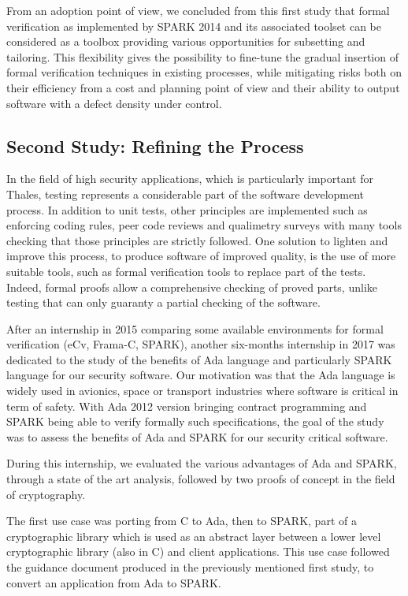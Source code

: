 \documentclass{llncs}
\begin{document}
From an adoption point of view, we concluded from this first study that formal
verification as implemented by SPARK 2014 and its associated toolset can be
considered as a toolbox providing various opportunities for subsetting and
tailoring. This flexibility gives the possibility to fine-tune the gradual
insertion of formal verification techniques in existing processes, while
mitigating risks both on their efficiency from a cost and planning point of
view and their ability to output software with a defect density under control.

\subsection{Second Study: Refining the Process}

In the field of high security applications, which is particularly important for
Thales, testing represents a considerable part of the software development
process. In addition to unit tests, other principles are implemented such as
enforcing coding rules, peer code reviews and qualimetry surveys with many
tools checking that those principles are strictly followed. One solution to
lighten and improve this process, to produce software of improved quality, is
the use of more suitable tools, such as formal verification tools to replace
part of the tests. Indeed, formal proofs allow a comprehensive checking of
proved parts, unlike testing that can only guaranty a partial checking of the
software.

After an internship in 2015 comparing some available environments for formal
verification (eCv, Frama-C, SPARK), another six-months internship in 2017 was
dedicated to the study of the benefits of Ada language and particularly SPARK
language for our security software. Our motivation was that the Ada language is
widely used in avionics, space or transport industries where software is
critical in term of safety. With Ada 2012 version bringing contract programming
and SPARK being able to verify formally such specifications, the goal of the
study was to assess the benefits of Ada and SPARK for our security critical
software.

During this internship, we evaluated the various advantages of Ada and SPARK,
through a state of the art analysis, followed by two proofs of concept in the
field of cryptography.

The first use case was porting from C to Ada, then to SPARK, part of a
cryptographic library which is used as an abstract layer between a lower level
cryptographic library (also in C) and client applications. This use case
followed the guidance document produced in the previously mentioned first
study, to convert an application from Ada to SPARK.
\end{document}
